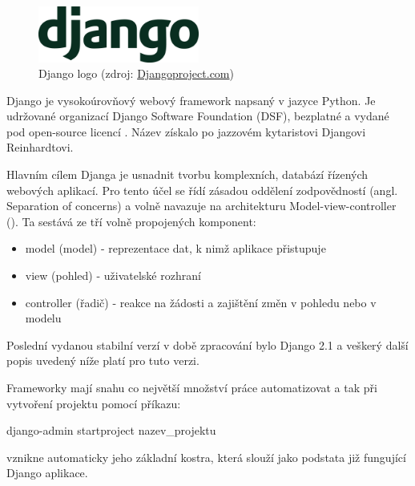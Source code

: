 \begin{figure}[H] \centering
      \includegraphics[width=150pt]{./pictures/django-logo-positive.png}
      \caption[Django logo]{Django logo (zdroj:
\href{https://static.djangoproject.com/img/logos/django-logo-positive.png}{Djangoproject.com})}
      \label{fig:django}
  \end{figure}


Django je vysokoúrovňový webový framework napsaný v jazyce Python. Je
udržované organizací Django Software Foundation (DSF), bezplatné a
vydané pod open-source licencí . Název získalo po jazzovém
kytaristovi Djangovi Reinhardtovi.

Hlavním cílem Djanga je usnadnit tvorbu komplexních, databází řízených
webových aplikací. Pro tento účel se řídí zásadou oddělení
zodpovědností (angl. Separation of concerns) a volně navazuje na
architekturu Model-view-controller (). Ta sestává ze tří volně
propojených komponent:
\begin{itemize}
\item model (model) - reprezentace dat, k nimž aplikace přistupuje
\item view (pohled) - uživatelské rozhraní
\item controller (řadič) - reakce na žádosti a zajištění změn v pohledu nebo v modelu
\end{itemize}

Poslední vydanou stabilní verzí v době zpracování bylo Django 2.1 a
veškerý další popis uvedený níže platí pro tuto verzi.

Frameworky mají snahu co největší množství práce automatizovat a tak
při vytvoření projektu pomocí příkazu:

\begin{center}
\textsf{django-admin startproject nazev\_projektu}
\end{center}

vznikne automaticky jeho základní kostra, která slouží jako podstata
již fungující Django aplikace.

